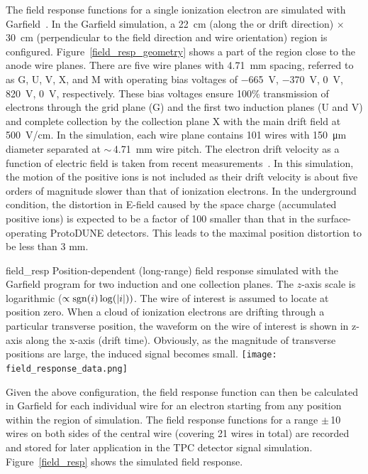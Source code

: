 The field response functions for a single ionization electron are simulated with Garfield~\cite{garfield}.  
In the Garfield simulation, a \SI{22}{cm} (along the \efield or drift direction) $\times$ 
\SI{30}{cm} (perpendicular to the field direction and wire orientation) region is configured.  
Figure~\ref{field_resp_geometry} shows a part of the region close to the anode wire planes. There are five wire planes with \SI{4.71}{mm} spacing, referred to as G, U, V, X, and 
M with operating bias voltages of \SI{-665}{V}, \SI{-370}{V}, \SI{0}{V}, \SI{820}{V}, \SI{0}{V}, respectively.  
These bias voltages ensure 100\% transmission of electrons through the grid plane (G) and the 
first two induction planes (U and V) and complete collection by the collection plane X with the main drift 
field at \SI{500}{V/cm}. In the simulation, each wire plane contains 101 wires with \SI{150}{\micro\meter} diameter
  separated at $\sim\,$\SI{4.71}{\mm} wire pitch. The electron drift velocity as a function of electric
  field is taken from recent measurements~\cite{Li:2015rqa,larpropertiesbnl}. In this simulation, the motion of the positive ions is not included as their drift velocity is about five orders of magnitude slower than that of ionization electrons. In the underground condition, the distortion in E-field caused by the space charge (accumulated positive ions) is expected to be a factor of 100 smaller than that in the surface-operating ProtoDUNE detectors. This leads to the maximal position distortion to be less than 3 mm. 
\begin{dunefigure}
{field_resp}
{Position-dependent (long-range) field response simulated with the Garfield program 
for two induction and one collection planes.
The $z$-axis scale is logarithmic ($\propto{\rm sgn}(i)\log(|i|))$.
The wire of interest 
is assumed to locate at position zero. When a cloud of ionization electrons are drifting through a particular transverse position, the waveform on the wire of interest is shown in z-axis along the x-axis (drift time). Obviously, as the magnitude of transverse positions are large, the induced signal becomes small.}
\texttt{[image: field\_response\_data.png]}
\end{dunefigure}


 Given the above configuration, the field response function can then be calculated in Garfield
  for each individual wire  for an
  electron starting from any position within the region of simulation. 
  The field response functions for a range $\pm\,$10 wires on both sides of the central wire (covering 21 wires in total) are 
  recorded %
  and stored for later
  application in the TPC detector signal simulation.
  Figure~\ref{field_resp} shows the simulated field response.
  
